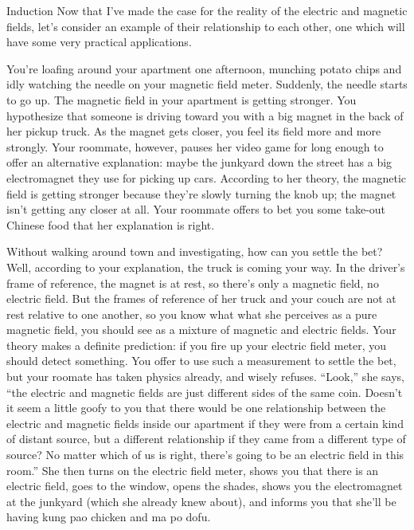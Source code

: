 \begin{envsubsection}{Induction}
Now that I've made the case for the reality of the electric and magnetic fields,
let's consider an example of their relationship to each other, one which will have
some very practical applications.

You're loafing around your apartment one afternoon, munching potato chips and
idly watching the needle on your magnetic field meter. Suddenly, the needle starts
to go up. The magnetic field in your apartment is getting stronger. You hypothesize
that someone is driving toward you with a big magnet in the back of her pickup truck.
As the magnet gets closer, you feel its field more and more strongly. Your roommate,
however, pauses her video game for long enough to offer an alternative explanation:
maybe the junkyard down the street has a big electromagnet they use for picking up
cars. According to her theory, the magnetic field is getting stronger because they're
slowly turning the knob up; the magnet isn't getting any closer at all. Your roommate
offers to bet you some take-out Chinese food that her explanation is right.

Without walking around town and investigating, how can you settle the bet?
Well, according to your explanation, the truck is coming your way. In the driver's
frame of reference, the magnet is at rest, so there's only a magnetic field, no
electric field. But the frames of reference of her truck and your couch are not
at rest relative to one another, so you know what what she perceives as a pure
magnetic field, you should see as a mixture of magnetic and electric fields.
Your theory makes a definite prediction: if you fire up your electric field meter,
you should detect something.
You offer to use such a measurement to settle the bet, but
your roomate has taken physics already, and wisely refuses. ``Look,'' she says, ``the
electric and magnetic fields are just different sides of the same coin. Doesn't it seem a little
goofy to you that there would be one relationship between the electric
and magnetic fields inside our apartment if they were from a certain kind of distant source,
but a different relationship if they came from a different type of source? No matter which
of us is right, there's going to be an electric field in this room.'' She then turns on the
electric field meter, shows you that there is an electric field, goes to the window,
opens the shades, shows you the electromagnet at the junkyard (which she already knew
about), and informs you that she'll be having kung pao chicken and ma po dofu.


\end{envsubsection}
